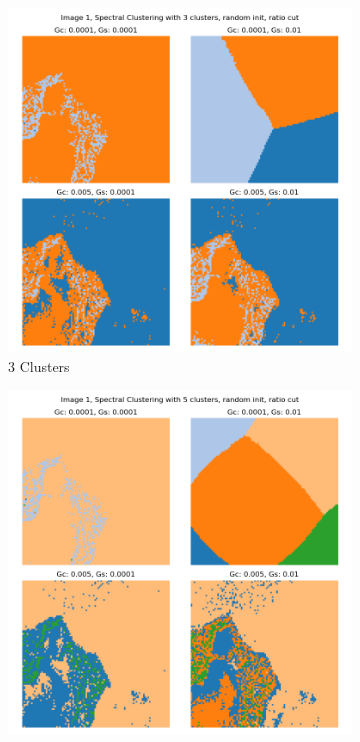 \documentclass{homework}
\begin{document}
\begin{figure}[H]
    \centering
    \begin{subfigure}{0.32\textwidth}
        \centering
        \includegraphics[width=\textwidth]{output_grid/image1_sc-ratio-random-3.png}
        \caption{3 Clusters}
    \end{subfigure}
    \begin{subfigure}{0.32\textwidth}
        \centering
        \includegraphics[width=\textwidth]{output_grid/image1_sc-ratio-random-5.png}

\end{subfigure}
\end{figure}
\end{document}
